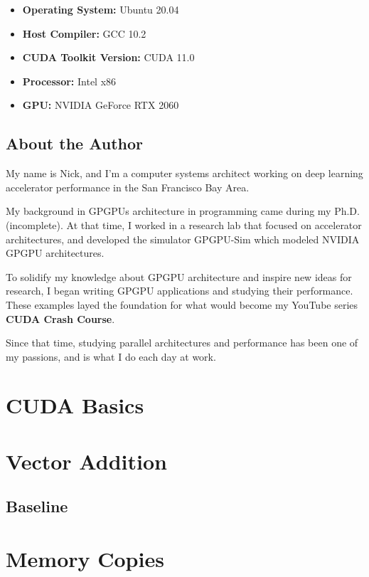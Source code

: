 \documentclass[11pt,fancy,authoryear]{elegantbook}
\begin{document}
\begin{itemize}
  \item \textbf{Operating System: } Ubuntu 20.04
  \item \textbf{Host Compiler: } GCC 10.2
  \item \textbf{CUDA Toolkit Version: } CUDA 11.0
  \item \textbf{Processor: } Intel x86
  \item \textbf{GPU: } NVIDIA GeForce RTX 2060
\end{itemize}

\section{About the Author}

My name is Nick, and I'm a computer systems architect working on deep learning accelerator performance in the San Francisco Bay Area.

My background in GPGPUs architecture in programming came during my Ph.D. (incomplete). At that time, I worked in a research lab that focused on accelerator architectures, and developed the simulator GPGPU-Sim which modeled NVIDIA GPGPU architectures.

To solidify my knowledge about GPGPU architecture and inspire new ideas for research, I began writing GPGPU applications and studying their performance. These examples layed the foundation for what would become my YouTube series \textbf{CUDA Crash Course}.

Since that time, studying parallel architectures and performance has been one of my passions, and is what I do each day at work.

\chapter{CUDA Basics}

\chapter{Vector Addition}

\section{Baseline}

\chapter{Memory Copies}
\end{document}
